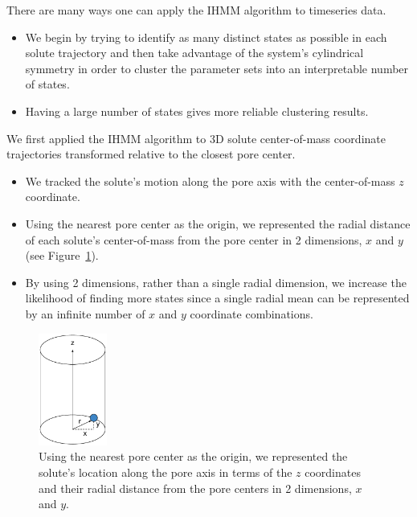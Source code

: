 \documentclass{article}
\begin{document}
  There are many ways one can apply the IHMM algorithm to timeseries data. 
  \begin{itemize}
    \item We begin by trying to identify as many distinct states as possible
    in each solute trajectory and then take advantage of the system's cylindrical
    symmetry in order to cluster the parameter sets into an interpretable number
    of states.
    \item Having a large number of states gives more reliable clustering results.
  \end{itemize}
  
  We first applied the IHMM algorithm to 3D solute center-of-mass coordinate 
  trajectories transformed relative to the closest pore center.
  \begin{itemize}
    \item We tracked the solute's motion along the pore axis with the center-of-mass
    $z$ coordinate.
    \item Using the nearest pore center as the origin, we represented the radial 
    distance of each solute's center-of-mass from the pore center in 2 dimensions,
    $x$ and $y$ (see Figure~\ref{fig:cartesian_cylinder}).
    \item By using 2 dimensions, rather than a single radial dimension, we
    increase the likelihood of finding more states since a single radial
    mean can be represented by an infinite number of $x$ and $y$ coordinate combinations.
  \end{itemize}
  
  \begin{figure}
  \centering
  \includegraphics[width=0.2\textwidth]{cartesian_cylinder.pdf}
  \caption{Using the nearest pore center as the origin, we represented the solute's
  location along the pore axis in terms of the $z$ coordinates and their radial distance
  from the pore centers in 2 dimensions, $x$ and $y$.}\label{fig:cartesian_cylinder}
  \end{figure}
  
\end{document}
